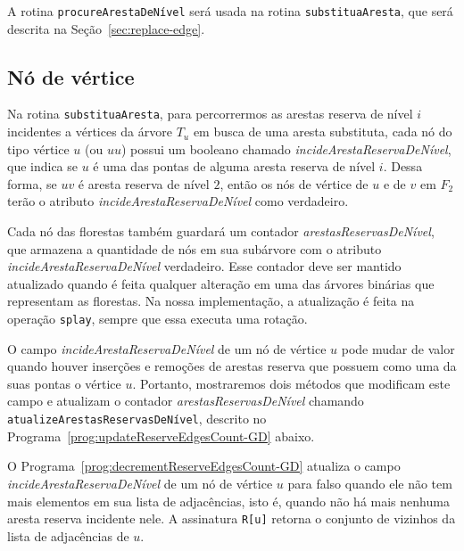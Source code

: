 A rotina \texttt{procureArestaDeNível} será usada na rotina \texttt{substituaAresta}, que será descrita na Seção~\ref{sec:replace-edge}.

\subsection{Nó de vértice}
\label{sec:node-vertex}

Na rotina \texttt{substituaAresta}, para percorrermos as arestas reserva de nível $i$ incidentes a vértices da árvore $T_u$ em busca de uma aresta substituta, cada nó do tipo vértice $u$ (ou $uu$) possui um booleano chamado \textit{incideArestaReservaDeNível}, que indica se $u$ é uma das pontas de alguma aresta reserva de nível $i$. Dessa forma, se $uv$ é aresta reserva de nível $2$, então os nós de vértice de $u$ e de $v$ em $F_2$ terão o atributo \textit{incideArestaReservaDeNível} como verdadeiro. 

Cada nó das florestas também guardará um contador \textit{arestasReservasDeNível}, que armazena a quantidade de nós em sua subárvore com o atributo \textit{incideArestaReservaDeNível} verdadeiro. Esse contador deve ser mantido atualizado quando é feita qualquer alteração em uma das árvores binárias que representam as florestas. Na nossa implementação, a atualização é feita na operação \texttt{splay}, sempre que essa executa uma rotação. 

O campo \textit{incideArestaReservaDeNível} de um nó de vértice $u$ pode mudar de valor quando houver inserções e remoções de arestas reserva que possuem como uma da suas pontas o vértice $u$. Portanto, mostraremos dois métodos que modificam este campo e atualizam o contador \textit{arestasReservasDeNível} chamando \texttt{atualizeArestasReservasDeNível}, descrito no Programa~\ref{prog:updateReserveEdgesCount-GD} abaixo.  

O Programa~\ref{prog:decrementReserveEdgesCount-GD} atualiza o campo \textit{incideArestaReservaDeNível} de um nó de vértice $u$ para falso quando ele não tem mais elementos em sua lista de adjacências, isto é, quando não há mais nenhuma aresta reserva incidente nele. A assinatura \texttt{R[u]} retorna o conjunto de vizinhos da lista de adjacências de $u$.

